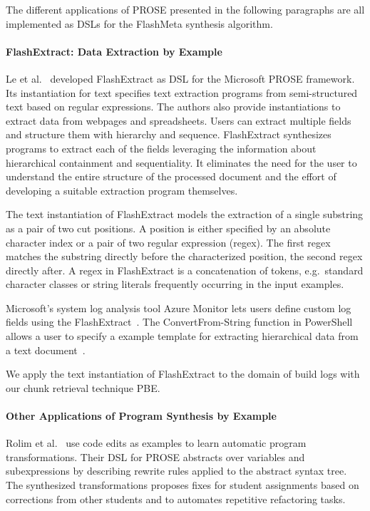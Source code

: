\documentclass[\myrootdir/main.tex]{subfiles}
\begin{document}
The different applications of PROSE presented in the following paragraphs are all implemented as DSLs for the FlashMeta synthesis algorithm.

\paragraph{FlashExtract: Data Extraction by Example}
Le et al.~\cite{le2014flashextract:} developed FlashExtract as DSL for the Microsoft PROSE framework.
Its instantiation for text specifies text extraction programs from semi-structured text based on regular expressions.
The authors also provide instantiations to extract data from webpages and spreadsheets.
Users can extract multiple fields and structure them with hierarchy and sequence.
FlashExtract synthesizes programs to extract each of the fields leveraging the information about hierarchical containment and sequentiality.
It eliminates the need for the user to understand the entire structure of the processed document and the effort of developing a suitable extraction program themselves.

The text instantiation of FlashExtract models the extraction of a single substring as a pair of two cut positions.
A position is either specified by an absolute character index or a pair of two regular expression (regex).
The first regex matches the substring directly before the characterized position, the second regex directly after.
A regex in FlashExtract is a concatenation of tokens, e.g.\ standard character classes or string literals frequently occurring in the input examples.

Microsoft's system log analysis tool Azure Monitor lets users define custom log fields using the FlashExtract~\cite{azure2019custom}.
The ConvertFrom-String function in PowerShell allows a user to specify a example template for extracting hierarchical data from a text document~\cite{powershell2019convert}.

We apply the text instantiation of FlashExtract to the domain of build logs with our chunk retrieval technique PBE\@.

\paragraph{Other Applications of Program Synthesis by Example}
Rolim et al.~\cite{rolim2017learning} use code edits as examples to learn automatic program transformations.
Their DSL for PROSE abstracts over variables and subexpressions by describing rewrite rules applied to the abstract syntax tree.
The synthesized transformations proposes fixes for student assignments based on corrections from other students and to automates repetitive refactoring tasks.
\end{document}
